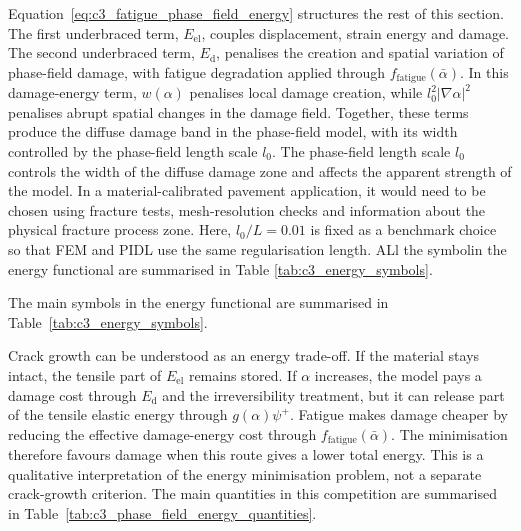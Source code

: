 Equation~\ref{eq:c3_fatigue_phase_field_energy} structures the rest of this section. The first underbraced term, $E_{\mathrm{el}}$, couples displacement, strain energy and damage. The second underbraced term, $E_{\mathrm{d}}$, penalises the creation and spatial variation of phase-field damage, with fatigue degradation applied through $f_{\mathrm{fatigue}}(\bar{\alpha})$. In this damage-energy term, $w(\alpha)$ penalises local damage creation, while $l_0^2|\nabla\alpha|^2$ penalises abrupt spatial changes in the damage field. Together, these terms produce the diffuse damage band in the phase-field model, with its width controlled by the phase-field length scale $l_0$. The phase-field length scale \(l_0\) controls the width of the diffuse damage zone and affects the apparent strength of the model. In a material-calibrated pavement application, it would need to be chosen using fracture tests, mesh-resolution checks and information about the physical fracture process zone. Here, \(l_0/L=0.01\) is fixed as a benchmark choice so that FEM and PIDL use the same regularisation length. ALl the symbolin the energy functional are summarised in Table \ref{tab:c3_energy_symbols}.

The main symbols in the energy functional are summarised in Table~\ref{tab:c3_energy_symbols}.

Crack growth can be understood as an energy trade-off. If the material stays intact, the tensile part of $E_{\mathrm{el}}$ remains stored. If $\alpha$ increases, the model pays a damage cost through $E_{\mathrm{d}}$ and the irreversibility treatment, but it can release part of the tensile elastic energy through $g(\alpha)\psi^+$. Fatigue makes damage cheaper by reducing the effective damage-energy cost through $f_{\mathrm{fatigue}}(\bar{\alpha})$. The minimisation therefore favours damage when this route gives a lower total energy. This is a qualitative interpretation of the energy minimisation problem, not a separate crack-growth criterion. The main quantities in this competition are summarised in Table~\ref{tab:c3_phase_field_energy_quantities}.
\FloatBarrier


